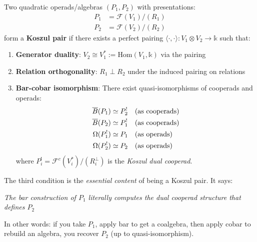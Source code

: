 \begin{definition}\label{def:classical-koszul-pair}
Two quadratic operads/algebras $(P_1, P_2)$ with presentations:
\begin{align*}
P_1 &= \mathcal{F}(V_1)/(R_1) \\
P_2 &= \mathcal{F}(V_2)/(R_2)
\end{align*}
form a \textbf{Koszul pair} if there exists a perfect pairing $\langle \cdot, \cdot \rangle: V_1 \otimes V_2 \to \mathbb{k}$ such that:

\begin{enumerate}
\item \textbf{Generator duality}: $V_2 \cong V_1^* := \text{Hom}(V_1, \mathbb{k})$ via the pairing

\item \textbf{Relation orthogonality}: $R_1 \perp R_2$ under the induced pairing on relations

\item \textbf{Bar-cobar isomorphism}: There exist quasi-isomorphisms of cooperads and operads:
\begin{align*}
\overline{B}(P_1) &\simeq P_2^! \quad \text{(as cooperads)} \\
\overline{B}(P_2) &\simeq P_1^! \quad \text{(as cooperads)} \\
\Omega(P_1^!) &\simeq P_1 \quad \text{(as operads)} \\
\Omega(P_2^!) &\simeq P_2 \quad \text{(as operads)}
\end{align*}
where $P_i^! = \mathcal{F}^c(V_i^*)/(R_i^\perp)$ is the \emph{Koszul dual cooperad}.
\end{enumerate}
\end{definition}

\begin{remark}
The third condition is the \emph{essential content} of being a Koszul pair. It says:
\begin{center}
\textit{The bar construction of $P_1$ literally computes the dual cooperad structure that defines $P_2$}
\end{center}

In other words: if you take $P_1$, apply bar to get a coalgebra, then apply cobar to rebuild an algebra, you recover $P_2$ (up to quasi-isomorphism).
\end{remark}

